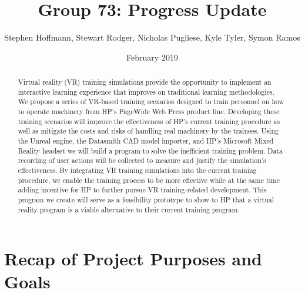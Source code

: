 \documentclass[onecolumn, draftclsnofoot,10pt, compsoc]{IEEEtran}
\title{Group 73: Progress Update}
\author{Stephen Hoffmann, Stewart Rodger, Nicholas Pugliese, Kyle Tyler, Symon Ramos}
\date{February 2019}
\begin{document}
\maketitle
    \begin{abstract}
   Virtual reality (VR) training simulations provide the opportunity to implement an interactive learning experience that improves on traditional learning methodologies. We propose a series of VR-based training scenarios designed to train personnel on how to operate machinery from HP’s PageWide Web Press product line. Developing these training scenarios will improve the effectiveness of HP’s current training procedure as well as mitigate the costs and risks of handling real machinery by the trainees. Using the Unreal engine, the Datasmith CAD model importer, and HP's Microsoft Mixed Reality headset we will build a program to solve the inefficient training problem. Data recording of user actions will be collected to measure and justify the simulation’s effectiveness. By integrating VR training simulations into the current training procedure, we enable the training process to be more effective while at the same time adding incentive for HP to further pursue VR training-related development. This program we create will serve as a feasibility prototype to show to HP that a virtual reality program is a viable alternative to their current training program.
    \end{abstract}
\newpage
{}
\tableofcontents
\clearpage



\section{Recap of Project Purposes and Goals}
\end{document}
